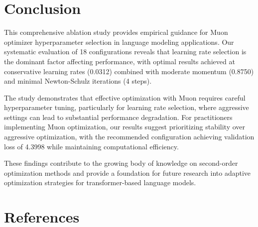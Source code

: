 \documentclass[11pt,a4paper]{article}
\begin{document}
\section{Conclusion}

This comprehensive ablation study provides empirical guidance for Muon optimizer hyperparameter selection in language modeling applications. Our systematic evaluation of 18 configurations reveals that learning rate selection is the dominant factor affecting performance, with optimal results achieved at conservative learning rates (0.0312) combined with moderate momentum (0.8750) and minimal Newton-Schulz iterations (4 steps).

The study demonstrates that effective optimization with Muon requires careful hyperparameter tuning, particularly for learning rate selection, where aggressive settings can lead to substantial performance degradation. For practitioners implementing Muon optimization, our results suggest prioritizing stability over aggressive optimization, with the recommended configuration achieving validation loss of 4.3998 while maintaining computational efficiency.

These findings contribute to the growing body of knowledge on second-order optimization methods and provide a foundation for future research into adaptive optimization strategies for transformer-based language models.

\section*{References}
\end{document}
